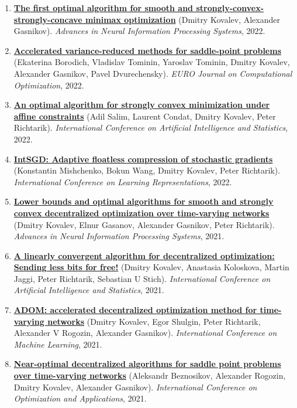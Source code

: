 \begin{enumerate}
\item
\textbf{\href{https://proceedings.neurips.cc/paper_files/paper/2022/hash/5e2ed801f62102f531d109d7c6e1b62f-Abstract-Conference.html}{The first optimal algorithm for smooth and strongly-convex-strongly-concave minimax optimization}} (Dmitry Kovalev, Alexander Gasnikov). \textit{Advances in Neural Information Processing Systems}, 2022.
\item
\textbf{\href{https://www.mathnet.ru/eng/crm1069}{Accelerated variance-reduced methods for saddle-point problems}} (Ekaterina Borodich, Vladislav Tominin, Yaroslav Tominin, Dmitry Kovalev, Alexander Gasnikov, Pavel Dvurechensky). \textit{EURO Journal on Computational Optimization}, 2022.
\item
\textbf{\href{https://proceedings.mlr.press/v151/salim22a.html}{An optimal algorithm for strongly convex minimization under affine constraints}} (Adil Salim, Laurent Condat, Dmitry Kovalev, Peter Richtarik). \textit{International Conference on Artificial Intelligence and Statistics}, 2022.
\item
\textbf{\href{https://arxiv.org/abs/2102.08374}{IntSGD: Adaptive floatless compression of stochastic gradients}} (Konstantin Mishchenko, Bokun Wang, Dmitry Kovalev, Peter Richtarik). \textit{International Conference on Learning Representations}, 2022.
\item
\textbf{\href{https://proceedings.neurips.cc/paper_files/paper/2021/hash/bc37e109d92bdc1ea71da6c919d54907-Abstract.html}{Lower bounds and optimal algorithms for smooth and strongly convex decentralized optimization over time-varying networks}} (Dmitry Kovalev, Elnur Gasanov, Alexander Gasnikov, Peter Richtarik). \textit{Advances in Neural Information Processing Systems}, 2021.
\item
\textbf{\href{https://proceedings.mlr.press/v130/kovalev21a.html}{A linearly convergent algorithm for decentralized optimization: Sending less bits for free!}} (Dmitry Kovalev, Anastasia Koloskova, Martin Jaggi, Peter Richtarik, Sebastian U Stich). \textit{International Conference on Artificial Intelligence and Statistics}, 2021.
\item
\textbf{\href{http://proceedings.mlr.press/v139/kovalev21a}{ADOM: accelerated decentralized optimization method for time-varying networks}} (Dmitry Kovalev, Egor Shulgin, Peter Richtarik, Alexander V Rogozin, Alexander Gasnikov). \textit{International Conference on Machine Learning}, 2021.
\item
\textbf{\href{https://link.springer.com/chapter/10.1007/978-3-030-91059-4_18}{Near-optimal decentralized algorithms for saddle point problems over time-varying networks}} (Aleksandr Beznosikov, Alexander Rogozin, Dmitry Kovalev, Alexander Gasnikov). \textit{International Conference on Optimization and Applications}, 2021.

\end{enumerate}
